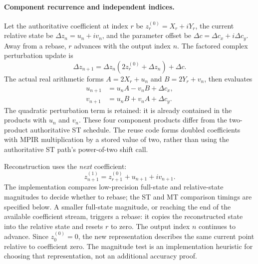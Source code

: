 \paragraph{Component recurrence and independent indices.}
Let the authoritative coefficient at index $r$ be
$z_r^{(0)}=X_r+iY_r$, the current relative state be
$\Delta z_n=u_n+i v_n$, and the parameter offset be
$\Delta c=\Delta c_x+i\Delta c_y$. Away from a rebase, $r$ advances with
the output index $n$. The factored complex perturbation update is
\begin{equation}
 \Delta z_{n+1}=\Delta z_n(2z_r^{(0)}+\Delta z_n)+\Delta c.
 \label{eq:reuse-factored-complex}
\end{equation}
The actual real arithmetic forms $A=2X_r+u_n$ and $B=2Y_r+v_n$, then evaluates
\begin{align}
 u_{n+1}&=u_n A-v_n B+\Delta c_x, \label{eq:reuse-component-real}\\
 v_{n+1}&=u_n B+v_n A+\Delta c_y. \label{eq:reuse-component-imag}
\end{align}
The quadratic perturbation term is retained: it is already contained in the products
with $u_n$ and $v_n$. These four component products differ from the two-product
authoritative ST schedule. The reuse code forms doubled coefficients with
MPIR multiplication by a stored value of two, rather than using the
authoritative ST path's power-of-two shift call.

Reconstruction uses the \emph{next} coefficient:
\begin{equation}
 z_{n+1}^{(1)}=z_{r+1}^{(0)}+u_{n+1}+i v_{n+1}.
 \label{eq:reuse-reconstruct-next}
\end{equation}
The implementation compares low-precision full-state and relative-state
magnitudes to decide whether to rebase; the ST and MT comparison timings are
specified below. A smaller full-state magnitude, or reaching the end of the
available coefficient stream, triggers a rebase:
it copies the reconstructed state into the relative state and resets $r$ to
zero. The output index $n$ continues to advance. Since $z_0^{(0)}=0$, the new
representation describes the same current point relative to coefficient zero.
The magnitude test is an implementation heuristic for choosing that
representation, not an additional accuracy proof.

